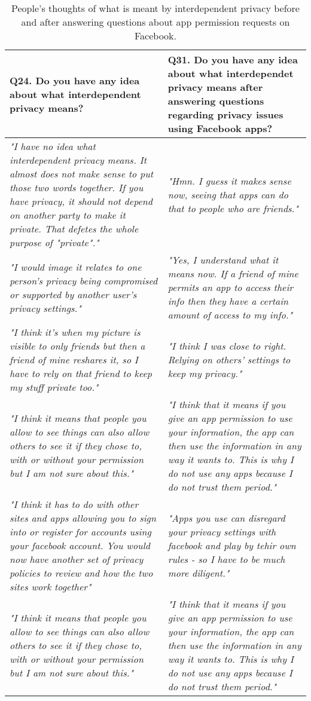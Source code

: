 \begin{center}
\begin{longtable}{ | p{6cm} | p{6cm} |}
    \caption{\label{tab:thoughtonintpriv}People's thoughts of what is meant by interdependent privacy before and after answering questions about app permission requests on Facebook.} \\
    \hline
\textbf{Q24. Do you have any idea about what interdependent privacy means?} & \textbf{Q31. Do you have any idea about what interdependet privacy means after answering questions regarding privacy issues using Facebook apps?} \\ 
\hline
\textit{"I have no idea what interdependent privacy means. It almost does not make sense to put those two words together. If you have privacy, it should not depend on another party to make it private. That defetes the whole purpose of "private"."} &  \textit{"Hmn. I guess it makes sense now, seeing that apps can do that to people who are friends."}\\ 
    \hline
\textit{"I would image it relates to one person's privacy being compromised or supported by another user's privacy settings."} & \textit{"Yes, I understand what it means now. If a friend of mine permits an app to access their info then they have a certain amount of access to my info."}\\ 
    \hline
\textit{"I think it's when my picture is visible to only friends but then a friend of mine reshares it, so I have to rely on that friend to keep my stuff private too."} &  \textit{"I think I was close to right. Relying on others' settings to keep my privacy."}\\ 
    \hline
\textit{"I think it means that people you allow to see things can also allow others to see it if they chose to, with or without your permission but I am not sure about this."} & \textit{"I think that it means if you give an app permission to use your information, the app can then use the information in any way it wants to. This is why I do not use any apps because I do not trust them period."}\\
    \hline
\textit{"I think it has to do with other sites and apps allowing you to sign into or register for accounts using your facebook account.  You would now have another set of privacy policies to review and how the two sites work together"} & \textit{"Apps you use can disregard your privacy settings with facebook and play by tehir own rules - so I have to be much more diligent."}\\
	\hline
\textit{"I think it means that people you allow to see things can also allow others to see it if they chose to, with or without your permission but I am not sure about this."} & \textit{"I think that it means if you give an app permission to use your information, the app can then use the information in any way it wants to. This is why I do not use any apps because I do not trust them period."}\\

\end{longtable}
\end{center}

